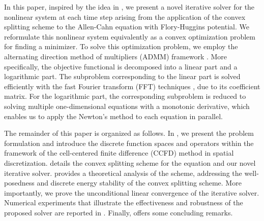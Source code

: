 \par In this paper, inspired by the idea in \cite{li2025overcoming}, we present a novel iterative solver for the nonlinear system at each time step arising from the application of the convex splitting scheme to the Allen-Cahn equation with Flory-Huggins potential. 
We reformulate this nonlinear system equivalently as a convex optimization problem for finding a minimizer. 
To solve this optimization problem, we employ the alternating direction method of multipliers (ADMM) framework \cite{neal2011distributed}. 
More specifically, the objective functional is decomposed into a linear part and a logarithmic part. 
The subproblem corresponding to the linear part is solved efficiently with the fast Fourier transform (FFT) techniques \cite{cooley1965algorithm}, due to its coefficient matrix. 
For the logarithmic part, the corresponding subproblem is reduced to solving multiple one-dimensional equations with a monotonic derivative, 
which enables us to apply the Newton's method to each equation \cite{dennis1996numerical,ortega2000iterative} in parallel.
\par The remainder of this paper is organized as follows. 
In , we present the problem formulation and introduce the discrete function spaces and operators within the framework of the cell-centered finite difference (CCFD) method in spatial discretization. 
 details the convex splitting scheme for the equation and our novel iterative solver. 
 provides a theoretical analysis of the scheme, addressing the well-posedness and discrete energy stability of the convex splitting scheme.
More importantly, we prove the unconditional linear convergence of the iterative solver. 
Numerical experiments that illustrate the effectiveness and robustness of the proposed solver are reported in . 
Finally,  offers some concluding remarks.


